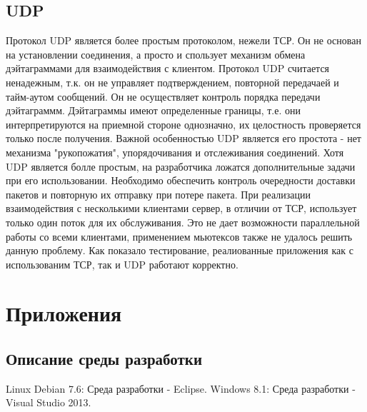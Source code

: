 \documentclass[12pt,a4paper]{report}
\begin{document}
\section{UDP}
Протокол UDP является более простым протоколом, нежели ТСР. Он не основан на установлении соединения, а просто и спользует механизм обмена дэйтаграммами для взаимодействия с клиентом.
\linebreak
Протокол UDP считается ненадежным, т.к. он не управляет подтверждением, повторной передачаей и тайм-аутом сообщений. Он не осуществляет контроль порядка передачи дэйтаграммм. Дэйтаграммы имеют определенные границы, т.е. они интерпретируются на приемной стороне однозначно, их целостность проверяется только после получения.
Важной особенностью UDP является его простота - нет механизма "рукопожатия", упорядочивания и отслеживания соединений.
Хотя UDP является болле простым, на разработчика ложатся дополнительные задачи при его использовании. Необходимо обеспечить контроль очередности доставки пакетов и повторную их отправку при потере пакета. При реализации взаимодействия с несколькими клиентами сервер, в отличии от ТСР, использует только один поток для их обслуживания. Это не дает возможности параллельной работы со всеми клиентами, применением мьютексов также не удалось решить данную проблему.
\linebreak
Как показало тестирование, реалиованные приложения как с использованим ТСР, так и UDP работают корректно.

\chapter{Приложения}
\section{Описание среды разработки}
Linux Debian 7.6: Среда разработки - Eclipse.\linebreak
Windows 8.1: Среда разработки - Visual Studio 2013.
\end{document}

